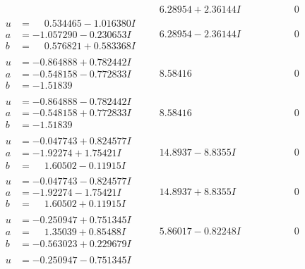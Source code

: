 \documentclass[1p]{elsarticle_modified}
\theoremstyle{definition}
\begin{document}
$$\begin{array}{c|c|c}
 & \phantom{-}6.28954 + 2.36144 I & \phantom{-0.000000 } 0 \\ \hline\begin{aligned}
u &= \phantom{-}0.534465 - 1.016380 I \\
a &= -1.057290 - 0.230653 I \\
b &= \phantom{-}0.576821 + 0.583368 I\end{aligned}
 & \phantom{-}6.28954 - 2.36144 I & \phantom{-0.000000 } 0 \\ \hline\begin{aligned}
u &= -0.864888 + 0.782442 I \\
a &= -0.548158 - 0.772833 I \\
b &= -1.51839\phantom{ +0.000000I}\end{aligned}
 & \phantom{-}8.58416\phantom{ +0.000000I} & \phantom{-0.000000 } 0 \\ \hline\begin{aligned}
u &= -0.864888 - 0.782442 I \\
a &= -0.548158 + 0.772833 I \\
b &= -1.51839\phantom{ +0.000000I}\end{aligned}
 & \phantom{-}8.58416\phantom{ +0.000000I} & \phantom{-0.000000 } 0 \\ \hline\begin{aligned}
u &= -0.047743 + 0.824577 I \\
a &= -1.92274 + 1.75421 I \\
b &= \phantom{-}1.60502 - 0.11915 I\end{aligned}
 & \phantom{-}14.8937 - 8.8355 I & \phantom{-0.000000 } 0 \\ \hline\begin{aligned}
u &= -0.047743 - 0.824577 I \\
a &= -1.92274 - 1.75421 I \\
b &= \phantom{-}1.60502 + 0.11915 I\end{aligned}
 & \phantom{-}14.8937 + 8.8355 I & \phantom{-0.000000 } 0 \\ \hline\begin{aligned}
u &= -0.250947 + 0.751345 I \\
a &= \phantom{-}1.35039 + 0.85488 I \\
b &= -0.563023 + 0.229679 I\end{aligned}
 & \phantom{-}5.86017 - 0.82248 I & \phantom{-0.000000 } 0 \\ \hline\begin{aligned}
u &= -0.250947 - 0.751345 I \\

\end{aligned}
\end{array}$$
\end{document}
